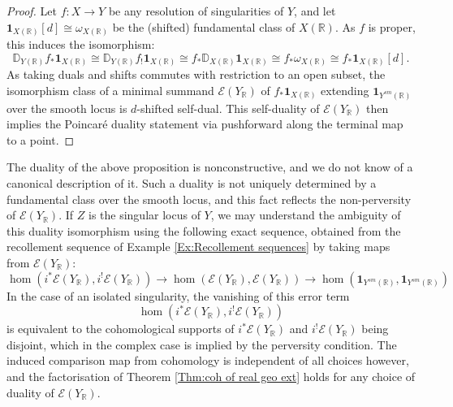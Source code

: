 \documentclass{amsart}
\theoremstyle{definition}
\theoremstyle{remark}
\begin{document}
\begin{proof}
Let $f:X\to Y$ be any resolution of singularities of $Y$, and let  $\mathbf{1}_{X(\mathbb{R})}[d]\cong \omega_{X(\mathbb{R})}$ be the (shifted) fundamental class of $X(\mathbb{R})$. As $f$ is proper, this induces the isomorphism:
\[\mathbb{D}_{Y(\mathbb{R})}f_*\mathbf{1}_{X(\mathbb{R})}\cong \mathbb{D}_{Y(\mathbb{R})} f_!\mathbf{1}_{X(\mathbb{R})}\cong f_*\mathbb{D}_{X(\mathbb{R})}\mathbf{1}_{X(\mathbb{R})}\cong f_*\omega_{X(\mathbb{R})}\cong f_*\mathbf{1}_{X(\mathbb{R})}[d].\]
As taking duals and shifts commutes with restriction to an open subset, the isomorphism class of a minimal summand $\mathscr{E}(Y_\mathbb{R})$ of $f_*\mathbf{1}_{X(\mathbb{R})}$ extending $\mathbf{1}_{Y^{sm}(\mathbb{R})}$ over the smooth locus is $d$-shifted self-dual. This self-duality of $\mathscr{E}(Y_\mathbb{R})$ then implies the Poincaré duality statement via pushforward along the terminal map to a point.
\end{proof}

The duality of the above proposition is nonconstructive, and we do not know of a canonical description of it. Such a duality is not uniquely determined by a fundamental class over the smooth locus, and this fact reflects the non-perversity of $\mathscr{E}(Y_\mathbb{R})$. If $Z$ is the singular locus of $Y$, we may understand the ambiguity of this duality isomorphism using the following exact sequence, obtained from the recollement sequence of Example \ref{Ex:Recollement sequences} by taking maps from $\mathscr{E}(Y_\mathbb{R})$:
\[\hom(i^*\mathscr{E}(Y_\mathbb{R}),i^!\mathscr{E}(Y_\mathbb{R}))\to \hom(\mathscr{E}(Y_\mathbb{R}),\mathscr{E}(Y_\mathbb{R}))\to \hom(\mathbf{1}_{Y^{sm}(\mathbb{R})},\mathbf{1}_{Y^{sm}(\mathbb{R})})\]
In the case of an isolated singularity, the vanishing of this error term \[\hom(i^*\mathscr{E}(Y_\mathbb{R}),i^!\mathscr{E}(Y_\mathbb{R}))\] is equivalent to the cohomological supports of $i^*\mathscr{E}(Y_\mathbb{R})$ and $i^!\mathscr{E}(Y_\mathbb{R})$ being disjoint, which in the complex case is implied by the perversity condition. The induced comparison map from cohomology is independent of all choices however, and the factorisation of Theorem \ref{Thm:coh of real geo ext} holds for any choice of duality of $\mathscr{E}(Y_\mathbb{R})$.
\end{document}
